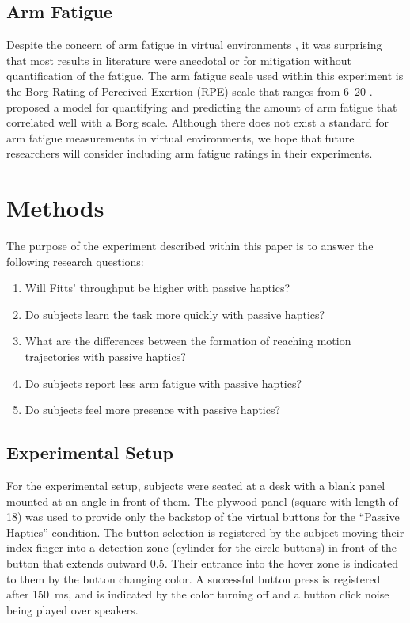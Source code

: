\subsection{Arm Fatigue}

Despite the concern of arm fatigue in virtual environments \citep{burdea_virtual_2003}, it was surprising that most results in literature were anecdotal or for mitigation without quantification of the fatigue.
The arm fatigue scale used within this experiment is the Borg Rating of Perceived Exertion (RPE) scale that ranges from \numrange{6}{20} \citep{borg_borgs_1998}.
\citet{hincapie-ramos_consumed_2014} proposed a model for quantifying and predicting the amount of arm fatigue that correlated well with a Borg scale.
Although there does not exist a standard for arm fatigue measurements in virtual environments, we hope that future researchers will consider including arm fatigue ratings in their experiments.

\section{Methods}

The purpose of the experiment described within this paper is to answer the following research questions:

\begin{enumerate}
    \item Will Fitts' throughput be higher with passive haptics?
    \item Do subjects learn the task more quickly with passive haptics?
    \item What are the differences between the formation of reaching motion trajectories with passive haptics?
    \item Do subjects report less arm fatigue with passive haptics?
    \item Do subjects feel more presence with passive haptics?
\end{enumerate}

\subsection{Experimental Setup}

For the experimental setup, subjects were seated at a desk with a blank panel mounted at an angle in front of them.
The plywood panel (square with length of \SI{18}{\inch}) was used to provide only the backstop of the virtual buttons for the ``Passive Haptics'' condition.
The button selection is registered by the subject moving their index finger into a detection zone (cylinder for the circle buttons) in front of the button that extends outward \SI{0.5}{\inch}.
Their entrance into the hover zone is indicated to them by the button changing color.
A successful button press is registered after \SI{150}{\milli\second}, and is indicated by the color turning off and a button click noise being played over speakers.


